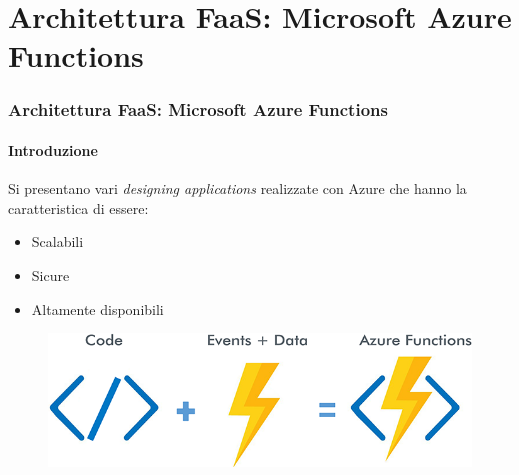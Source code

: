 \documentclass{beamer}
\begin{document}
	\section{Architettura FaaS: Microsoft Azure Functions}
	\begin{frame}
		\frametitle{Architettura FaaS: Microsoft Azure Functions}
		\framesubtitle{Introduzione}
		Si presentano vari \emph{designing applications} realizzate con Azure che hanno la caratteristica di essere:
		\begin{itemize}
			\item Scalabili
			\item Sicure
			\item Altamente disponibili
		\end{itemize}
		\begin{figure}
			\centering
			\includegraphics[width=.8\textwidth]{img/azure-functions-cover.png}
		\end{figure}
	\end{frame}
	
\end{document}
